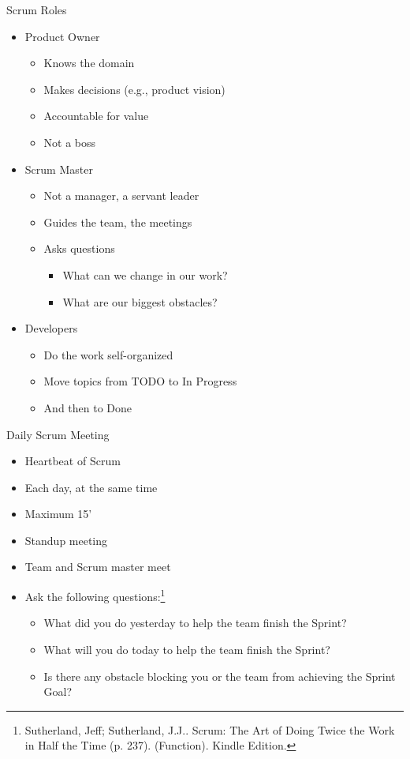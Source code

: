 \begin{frame}[fragile]{Scrum Roles}
\begin{itemize}
\item Product Owner
\begin{itemize}
\item Knows the domain
\item Makes decisions (e.g., product vision)
\item Accountable for value
\item Not a boss
\end{itemize}
\item Scrum Master
\begin{itemize}
\item Not a manager, a servant leader
\item Guides the team, the meetings
\item Asks questions
\begin{itemize}
\item What can we change in our work?
\item What are our biggest obstacles?
\end{itemize}
\end{itemize}
\item Developers
\begin{itemize}
\item Do the work self-organized
\item Move topics from TODO to In Progress
\item And then to Done
\end{itemize}
\end{itemize}
\end{frame}

\begin{frame}[fragile]{Daily Scrum Meeting}
\begin{itemize}
\item Heartbeat of Scrum
\item Each day, at the same time
\item Maximum 15'
\item Standup meeting
\item Team and Scrum master meet
\item Ask the following questions:\footnote{Sutherland, Jeff; Sutherland, J.J.. Scrum: The Art of Doing Twice the Work in Half the Time (p. 237). (Function). Kindle Edition.}
\begin{itemize}
\item What did you do yesterday to help the team finish the Sprint?
\item What will you do today to help the team finish the Sprint?
\item Is there any obstacle blocking you or the team from achieving the Sprint Goal?
\end{itemize}
\end{itemize}
\end{frame}


